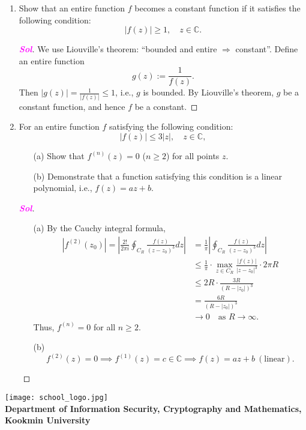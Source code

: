 \documentclass{article}
\newcommand{\footer}[1]{
\begin{flushright}
	\vspace{2em}
	\texttt{[image: school\_logo.jpg]} \\
	\vspace{1em}
	\textcolor{blue2}{\small\textbf{#1}}
\end{flushright}
}
\newcommand{\ie}{\textnormal{i.e.}}
\theoremstyle{definition}
\newcommand{\C}{\mathbb{C}}
\newcommand{\of}[1]{\left( #1 \right)}
\newcommand{\abs}[1]{\left\lvert #1 \right\rvert}
\newcommand{\sol}{\textcolor{magenta}{\bf Sol}}
\begin{document}
\begin{enumerate}
	\newpage
	\item Show that an entire function $f$ becomes a constant function if it satisfies the following condition: \[
	\abs{f\of{z}}\geq 1,\quad z\in\C.
	\]
	\begin{proof}[\sol]
		We use Liouville's theorem: ``bounded and entire $\Rightarrow$ constant''. Define an entire function \[
		g\of{z}:=\frac{1}{f\of{z}}.
		\] Then $\abs{g\of{z}}=\frac{1}{\abs{f\of{z}}}\leq 1$, \ie, $g$ is bounded. By Liouville's theorem, $g$ be a constant function, and hence $f$ be a constant.
	\end{proof}
	\vspace{8pt}
	\item For an entire function $f$ satisfying the following condition: \[
	\abs{f\of{z}}\leq 3\abs{z},\quad z\in\C,
	\] \begin{enumerate}
		\item[(a)] Show that $f^{(n)}(z) = 0$ ($n\geq 2$) for all points $z$.
		\item[(b)] Demonstrate that a function satisfying this condition is a linear polynomial, \ie, $f(z) = az + b$.
	\end{enumerate}\begin{proof}[\sol]
		\begin{itemize}
			\item[(a)] By the Cauchy integral formula, \begin{align*}
				\abs{f^{(2)}\of{z_0}}=\abs{\frac{2!}{2\pi i}\oint_{C_R}\frac{f\of{z}}{\of{z-z_0}^3}dz}&=\frac{1}{\pi}\abs{\oint_{C_R}\frac{f(z)}{(z-z_0)^3}dz}\\
				&\leq\frac{1}{\pi}\cdot\max_{z\in C_R}\frac{\abs{f\of{z}}}{\abs{z-z_0}^3}\cdot 2\pi R\\
				&\leq 2R\cdot\frac{3R}{\of{R-\abs{z_0}}^3}\\
				&=\frac{6R}{\of{R-\abs{z_0}}^3}\\
				&\to 0\quad\text{as $R\to\infty$}.
			\end{align*} Thus, $f^{(n)}=0$ for all $n\geq 2$.
			\vspace{4pt}
			\item[(b)] \[
			f^{(2)}(z)=0\implies f^{(1)}(z)=c\in\C\implies f(z)=az+b\ (\text{linear}).
			\]
		\end{itemize}
	\end{proof}
\end{enumerate}


\footer{Department of Information Security, Cryptography and Mathematics, Kookmin University}
\end{document}
